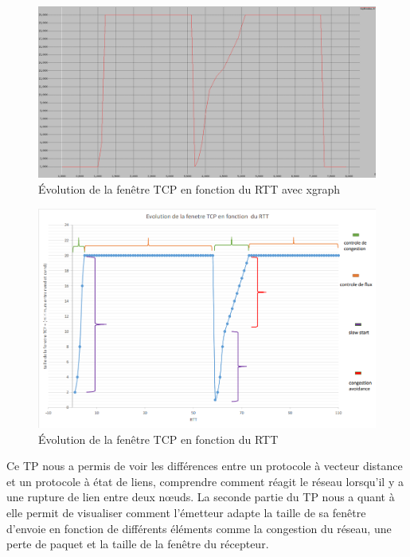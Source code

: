\documentclass[11pt]{article}
\begin{document}
\begin{figure}[H]
	\begin{center}
		\includegraphics[width=1\textwidth]{assets/tp2/tcpWindowXgraph.png}
	\end{center}
	\caption{Évolution de la fenêtre TCP en fonction du RTT avec xgraph}
	\label{graphXgraph}
\end{figure}

\begin{landscape}
\begin{figure}[H]
	\begin{center}
		\includegraphics[width=1.3\textwidth]{assets/tp2/graphiqueExcel.png}
	\end{center}
	\caption{Évolution de la fenêtre TCP en fonction du RTT}
	\label{graphExcel}
\end{figure}
\end{landscape}



Ce TP nous a permis de voir les différences entre un protocole à vecteur distance et un protocole à état de liens, comprendre comment réagit le réseau lorsqu’il y a une rupture de lien entre deux nœuds. La seconde partie du TP nous a quant à elle permit de visualiser comment l’émetteur adapte la taille de sa fenêtre d’envoie en fonction de différents éléments comme la congestion du réseau, une perte de paquet et la taille de la fenêtre du récepteur.
\end{document}

